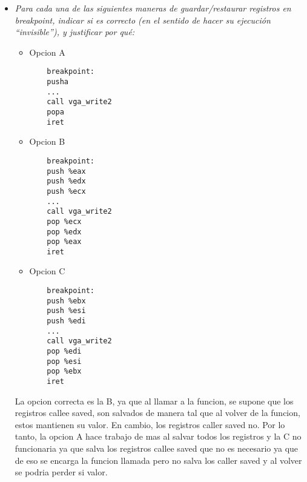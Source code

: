 \documentclass[a4paper, 12pt]{article}
\begin{document}
\begin{itemize}
\begin{lstlisting}[
columns=fullflexible,
basicstyle=\fontfamily{lmvtt}\selectfont,
]
	(gdb) print $eflags
	$8 = [ PF ZF ]
	(gdb) print/x $eflags
	$9 = 0x46
	(gdb) stepi
	kmain (mbi=0x9500) at kern2.c:78
	78	    asm("div %4"
	1: x/i $pc
	=> 0x100194 <kmain+77>:	mov    $0x0,%edx
	(gdb) x/10i $pc
	=> 0x100194 <kmain+77>:	mov    $0x0,%edx
	0x100199 <kmain+82>:	mov    $0xe0,%ecx
	0x10019e <kmain+87>:	mov    $0x12,%eax
	0x1001a3 <kmain+92>:	mov    %edx,%ebx
	0x1001a5 <kmain+94>:	div    %ebx
	0x1001a7 <kmain+96>:	movzbl %cl,%ecx
	0x1001aa <kmain+99>:	movsbl %al,%edx
	0x1001ad <kmain+102>:	mov    $0x100f77,%eax
	0x1001b2 <kmain+107>:	call   0x10009b <vga_write2>
	0x1001b7 <kmain+112>:	add    $0x10,%esp
	(gdb) print $esp
	$10 = (void *) 0x104d70
	(gdb) x/xw $esp
	0x104d70:	0x00000008
	(gdb) print $cs
	$11 = 8
	(gdb) print $eflags
	$12 = [ PF ZF ]
	(gdb) print/x $eflags
	$13 = 0x46
\end{lstlisting}
\item \textit{Para cada una de las siguientes maneras de
				guardar/restaurar registros en breakpoint, indicar si es
				correcto (en el sentido de hacer su ejecución “invisible”), y
				justificar por qué:}
				\begin{itemize}
					\item Opcion A
\begin{lstlisting}
	breakpoint:
	pusha
	...
	call vga_write2
	popa
	iret
\end{lstlisting}
					\item Opcion B
\begin{lstlisting}
	breakpoint:
	push %eax
	push %edx
	push %ecx
	...
	call vga_write2
	pop %ecx
	pop %edx
	pop %eax
	iret
\end{lstlisting}
					\item Opcion C
\begin{lstlisting}
	breakpoint:
	push %ebx
	push %esi
	push %edi
	...
	call vga_write2
	pop %edi
	pop %esi
	pop %ebx
	iret
\end{lstlisting}
\end{itemize}
					La opcion correcta es la B, ya que al llamar a la funcion,
					se supone que los registros callee saved, son salvados de
					manera tal que al volver de la funcion, estos mantienen
					su valor. En cambio, los registros caller saved no. Por lo
					tanto, la opcion A hace trabajo de mas al salvar todos los
					registros y la C no funcionaria ya que salva los registros
					callee saved que no es necesario ya que de eso se encarga la
					funcion llamada pero no salva los caller saved y al volver
					se podria perder si valor.\\
			\end{itemize}
\end{document}
